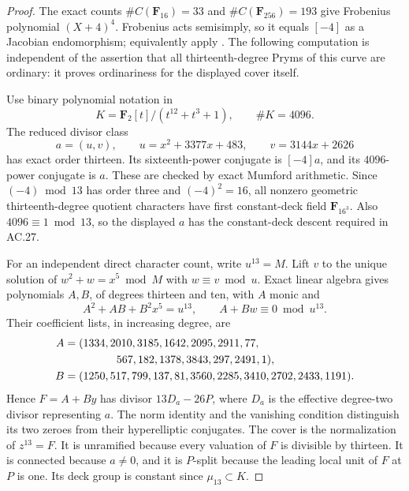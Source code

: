 \begin{proof}
The exact counts \(\#C(\mathbf F_{16})=33\) and
\(\#C(\mathbf F_{256})=193\) give Frobenius polynomial
\((X+4)^4\). Frobenius acts semisimply, so it equals \([-4]\)
as a Jacobian endomorphism; equivalently apply
\cite[Theorem~2(d), p.~140]{AC_Tate1966}.
The following computation is independent of the assertion that all
thirteenth-degree Pryms of this curve are ordinary: it proves
ordinariness for the displayed cover itself.

Use binary polynomial notation in
\[
 K=\mathbf F_2[t]/(t^{12}+t^3+1),\qquad \#K=4096.
\]
The reduced divisor class
\[
 a=(u,v),\qquad
 u=x^2+3377x+483,\qquad v=3144x+2626
\]
has exact order thirteen. Its sixteenth-power conjugate is
\([-4]a\), and its \(4096\)-power conjugate is \(a\).
These are checked by exact Mumford arithmetic. Since
\((-4)\bmod13\) has order three and \((-4)^2=16\), all nonzero
geometric thirteenth-degree quotient characters have first
constant-deck field \(\mathbf F_{16^3}\). Also
\(4096\equiv1\bmod13\), so the displayed \(a\) has the constant-deck
descent required in AC.27.

For an independent direct character count, write \(u^{13}=M\).
Lift \(v\) to the unique solution of \(w^2+w=x^5\bmod M\) with
\(w\equiv v\bmod u\). Exact linear algebra gives polynomials
\(A,B\), of degrees thirteen and ten, with \(A\) monic and
\[
 A^2+AB+B^2x^5=u^{13},\qquad A+Bw\equiv0\bmod u^{13}.
\]
Their coefficient lists, in increasing degree, are
\[
\begin{aligned}
 A={}&(1334,2010,3185,1642,2095,2911,77,\\
     &\hspace{12mm}567,182,1378,3843,297,2491,1),\\
 B={}&(1250,517,799,137,81,3560,2285,3410,2702,2433,1191).
\end{aligned}
\]
Hence \(F=A+By\) has divisor \(13D_a-26P\), where
\(D_a\) is the effective degree-two divisor representing \(a\).
The norm identity and the vanishing condition distinguish its
two zeroes from their hyperelliptic conjugates.
The cover is the normalization of \(z^{13}=F\).
It is unramified because every valuation of \(F\) is divisible
by thirteen. It is connected because \(a\ne0\), and it is
\(P\)-split because the leading local unit of \(F\) at \(P\)
is one. Its deck group is constant since \(\mu_{13}\subset K\).


\end{proof}
